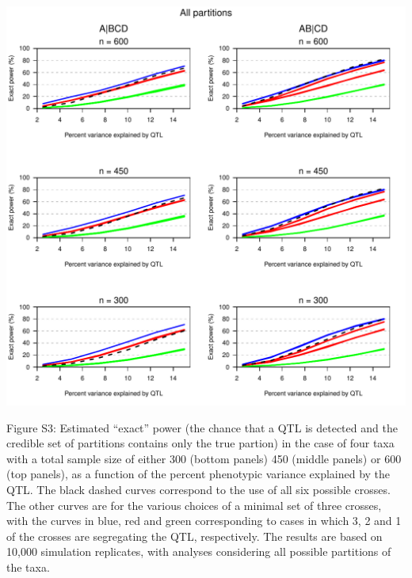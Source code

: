 \documentclass[letterpaper,twoside]{article}
\begin{document}
\newpage

{\centering
\includegraphics{SuppFigs/expower_allpart.pdf}}

\bigskip \noindent
Figure S3: Estimated ``exact'' power (the chance that a QTL is detected and the
credible set of partitions contains only the true partion) in the case of four taxa with a total
  sample size of either 300 (bottom panels) 450 (middle panels) or 600
  (top panels), as a function of the percent phenotypic variance
  explained by the QTL.  The black dashed curves correspond to the use
  of all six possible crosses.  The other curves are for the various
  choices of a minimal set of three crosses, with the curves in blue,
  red and green corresponding to cases in which 3, 2 and 1 of the
  crosses are segregating the QTL, respectively.  The results are
  based on 10,000 simulation replicates, with analyses considering all
  possible partitions of the taxa.

\newpage
\end{document}
